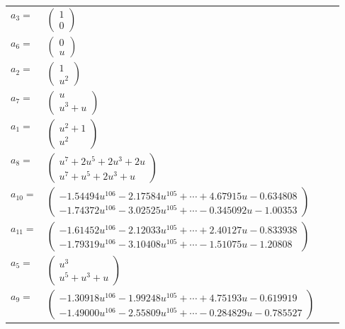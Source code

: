 \documentclass[1p]{elsarticle_modified}
\theoremstyle{definition}
\begin{document}
\begin{tabular}{m{7pt} m{180pt} m{7pt} m{180pt} }
\flushright $a_{3}=$&$\begin{pmatrix}1\\0\end{pmatrix}$ \\
\flushright $a_{6}=$&$\begin{pmatrix}0\\u\end{pmatrix}$ \\
\flushright $a_{2}=$&$\begin{pmatrix}1\\u^2\end{pmatrix}$ \\
\flushright $a_{7}=$&$\begin{pmatrix}u\\u^3+u\end{pmatrix}$ \\
\flushright $a_{1}=$&$\begin{pmatrix}u^2+1\\u^2\end{pmatrix}$ \\
\flushright $a_{8}=$&$\begin{pmatrix}u^7+2 u^5+2 u^3+2 u\\u^7+u^5+2 u^3+u\end{pmatrix}$ \\
\flushright $a_{10}=$&$\begin{pmatrix}-1.54494 u^{106}-2.17584 u^{105}+\cdots+4.67915 u-0.634808\\-1.74372 u^{106}-3.02525 u^{105}+\cdots-0.345092 u-1.00353\end{pmatrix}$ \\
\flushright $a_{11}=$&$\begin{pmatrix}-1.61452 u^{106}-2.12033 u^{105}+\cdots+2.40127 u-0.833938\\-1.79319 u^{106}-3.10408 u^{105}+\cdots-1.51075 u-1.20808\end{pmatrix}$ \\
\flushright $a_{5}=$&$\begin{pmatrix}u^3\\u^5+u^3+u\end{pmatrix}$ \\
\flushright $a_{9}=$&$\begin{pmatrix}-1.30918 u^{106}-1.99248 u^{105}+\cdots+4.75193 u-0.619919\\-1.49000 u^{106}-2.55809 u^{105}+\cdots-0.284829 u-0.785527\end{pmatrix}$ \\

\end{tabular}
\end{document}
